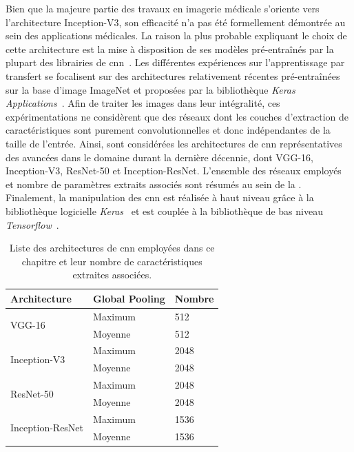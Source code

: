 Bien que la majeure partie des travaux en imagerie médicale s'oriente vers l'architecture Inception-V3, son efficacité n'a pas été formellement démontrée au sein des applications médicales. La raison la plus probable expliquant le choix de cette architecture est la mise à disposition de ses modèles pré-entraînés par la plupart des librairies de \gls{cnn}~\cite{Litjens2017}. Les différentes expériences sur l'apprentissage par transfert se focalisent sur des architectures relativement récentes pré-entraînées sur la base d'image ImageNet et proposées par la bibliothèque \textit{Keras Applications}~\cite{chollet2015a}. Afin de traiter les images dans leur intégralité, ces expérimentations ne considèrent que des réseaux dont les couches d'extraction de caractéristiques sont purement convolutionnelles et donc indépendantes de la taille de l'entrée. Ainsi, sont considérées les architectures de \gls{cnn} représentatives des avancées dans le domaine durant la dernière décennie, dont VGG-16, Inception-V3, ResNet-50 et Inception-ResNet. L'ensemble des réseaux employés et nombre de paramètres extraits associés sont résumés au sein de la . Finalement, la manipulation des \ac{cnn} est réalisée à haut niveau grâce à la bibliothèque logicielle \textit{Keras}~\cite{chollet2015} et est couplée à la bibliothèque de bas niveau \textit{Tensorflow}~\cite{Tensorflow2016}.\par

\begin{table}[H]
    \centering
    \begin{tabular}{lll}
    \toprule
    \textbf{Architecture}               & Global Pooling   & \textbf{Nombre}    \\ \hline
    \multirow{2}{*}{VGG-16}             & Maximum          & 512                \\ \cline{2-3}
                                        & Moyenne          & 512                \\ \hline
    \multirow{2}{*}{Inception-V3}       & Maximum          & 2048               \\ \cline{2-3}
                                        & Moyenne          & 2048               \\ \hline
    \multirow{2}{*}{ResNet-50}          & Maximum          & 2048               \\ \cline{2-3}
                                        & Moyenne          & 2048               \\ \hline
    \multirow{2}{*}{Inception-ResNet}   & Maximum          & 1536               \\ \cline{2-3}
                                        & Moyenne          & 1536               \\
    \bottomrule
    \end{tabular}
    \caption{Liste des architectures de \gls{cnn} employées dans ce chapitre et leur nombre de caractéristiques extraites associées.}
    \label{tab:number_features_transferlearning}
\end{table}\par
\clearpage

